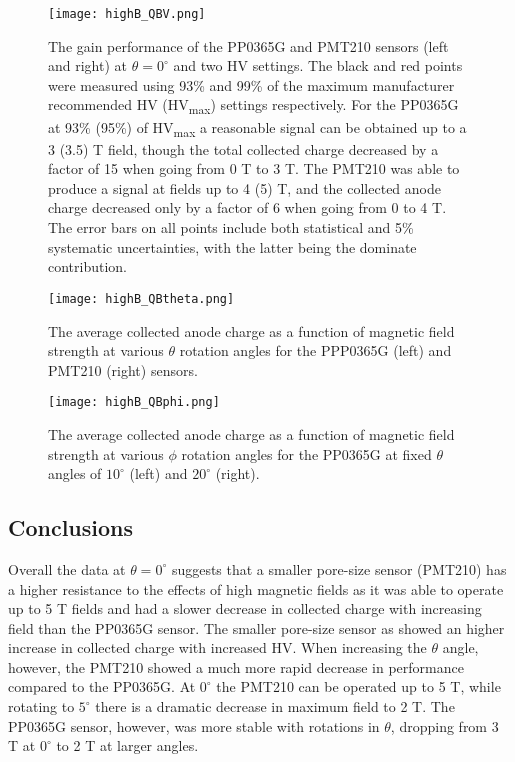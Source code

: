 \begin{figure}[!htb]
	\centering
	\texttt{[image: highB\_QBV.png]}
	\caption{The gain performance of the PP0365G and PMT210 sensors (left and right) at $\theta = 0^{\circ}$ and two HV settings. The black and red points were measured using 93\% and 99\% of the maximum manufacturer recommended HV (HV\textsubscript{max}) settings respectively. For the PP0365G at 93\% (95\%) of HV\textsubscript{max} a reasonable signal can be obtained up to a 3 (3.5) T field, though the total collected charge decreased by a factor of 15 when going from 0 T to 3 T. The PMT210 was able to produce a signal at fields up to 4 (5) T, and the collected anode charge decreased only by a factor of 6 when going from 0 to 4 T. The error bars on all points include both statistical and 5\% systematic uncertainties, with the latter being the dominate contribution.}
	\label{fig:highB_nominal_HV}
\end{figure}

\begin{figure}[!htb]
	\centering
	\texttt{[image: highB\_QBtheta.png]}
	\caption{The average collected anode charge as a function of magnetic field strength at various $\theta$ rotation angles for the PPP0365G (left) and PMT210 (right) sensors.}
	\label{fig:highB_QBtheta}
\end{figure}

\begin{figure}[!htb]
	\centering
	\texttt{[image: highB\_QBphi.png]}
	\caption{The average collected anode charge as a function of magnetic field strength at various $\phi$ rotation angles for the PP0365G at fixed $\theta$ angles of $10^\circ$ (left) and $20^\circ$ (right).}
	\label{fig:highB_QBphi}
\end{figure}

\subsection{Conclusions}
Overall the data at $\theta = 0^{\circ}$ suggests that a smaller pore-size sensor (PMT210) has a higher resistance to the effects of high magnetic fields as it was able to operate up to 5 T fields and had a slower decrease in collected charge with increasing field than the PP0365G sensor. The smaller pore-size sensor as showed an higher increase in collected charge with increased HV. When increasing the $\theta$ angle, however, the PMT210 showed a much more rapid decrease in performance compared to the PP0365G. At $0^{\circ}$ the PMT210 can be operated up to 5 T, while rotating to $5^{\circ}$ there is a dramatic decrease in maximum field to 2 T. The PP0365G sensor, however, was more stable with rotations in $\theta$, dropping from 3 T at $0^{\circ}$ to 2 T at larger angles.

